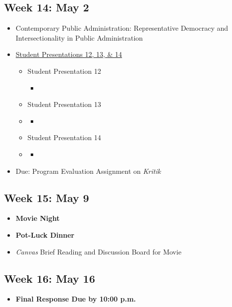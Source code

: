 \documentclass[10pt, letterpaper]{article}
\begin{document}
    \subsection*{Week 14: May 2}
    \begin{itemize}
        \item Contemporary Public Administration: Representative Democracy and Intersectionality in Public Administration
        \item \underline{Student Presentations 12, 13, \& 14}
        \begin{itemize}
            \item Student Presentation 12
            \begin{itemize}
                \item \cite{Headly2021}
            \end{itemize}
            \item Student Presentation 13
            \item \begin{itemize}
                \item \cite{mccandless2022}
            \end{itemize}
            \item Student Presentation 14
            \item \begin{itemize}
                \item \cite{Zavattaro2022}
            \end{itemize}
        \end{itemize}
        \item Due: Program Evaluation Assignment on \emph{Kritik}
    \end{itemize}

    \subsection*{Week 15: May 9}
    \begin{itemize}
        \item \textbf{Movie Night}
        \item \textbf{Pot-Luck Dinner}
        \item \emph{Canvas} Brief Reading and Discussion Board for Movie
    \end{itemize}

    \subsection*{Week 16: May 16}
    \begin{itemize}
        \item \textbf{Final Response Due by 10:00 p.m.}
    \end{itemize}
\end{document}
